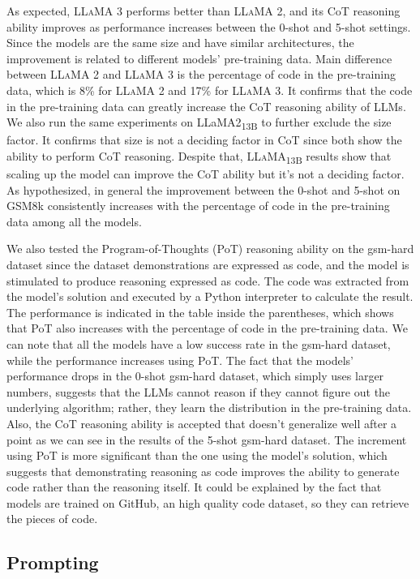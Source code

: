 As expected, \textsc{LLaMA} 3 performs better than \textsc{LLaMA} 2, and its CoT reasoning ability improves as performance increases between the 0-shot and 5-shot settings.
Since the models are the same size and have similar architectures, the improvement is related to different models' pre-training data.
Main difference between \textsc{LLaMA} 2 and \textsc{LLaMA} 3 is the percentage of code in the pre-training data, which is 8\% for \textsc{LLaMA} 2 and 17\% for \textsc{LLaMA} 3.
It confirms that the code in the pre-training data can greatly increase the CoT reasoning ability of LLMs.
We also run the same experiments on LLaMA2\textsubscript{13B} to further exclude the size factor.
It confirms that size is not a deciding factor in CoT since both show the ability to perform CoT reasoning.
Despite that, \textsc{LLaMA}\textsubscript{13B} results show that scaling up the model can improve the CoT ability but it's not a deciding factor.
As hypothesized, in general the improvement between the 0-shot and 5-shot on GSM8k consistently increases with the percentage of code in the pre-training data among all the models.

We also tested the Program-of-Thoughts (PoT) reasoning ability on the gsm-hard dataset since the dataset demonstrations are expressed as code, and the model is stimulated to produce reasoning expressed as code.
The code was extracted from the model's solution and executed by a Python interpreter to calculate the result.
The performance is indicated in the table inside the parentheses, which shows that PoT also increases with the percentage of code in the pre-training data.
We can note that all the models have a low success rate in the gsm-hard dataset, while the performance increases using PoT\@.
The fact that the models' performance drops in the 0-shot gsm-hard dataset, which simply uses larger numbers, suggests that the LLMs cannot reason if they cannot figure out the underlying algorithm; rather, they learn the distribution in the pre-training data.
Also, the CoT reasoning ability is accepted that doesn't generalize well after a point as we can see in the results of the 5-shot gsm-hard dataset.
The increment using PoT is more significant than the one using the model's solution, which suggests that demonstrating reasoning as code improves the ability to generate code rather than the reasoning itself.
It could be explained by the fact that models are trained on GitHub, an high quality code dataset, so they can retrieve the pieces of code.

\subsection{Prompting}
\label{subsec:prompting}

